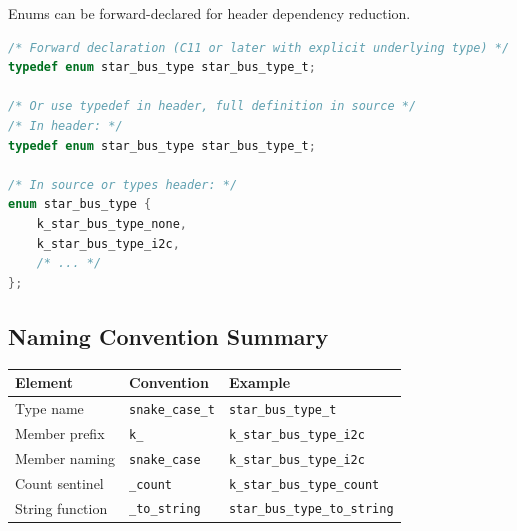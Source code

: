 Enums can be forward-declared for header dependency reduction.

\begin{lstlisting}[language=C]
/* Forward declaration (C11 or later with explicit underlying type) */
typedef enum star_bus_type star_bus_type_t;

/* Or use typedef in header, full definition in source */
/* In header: */
typedef enum star_bus_type star_bus_type_t;

/* In source or types header: */
enum star_bus_type {
    k_star_bus_type_none,
    k_star_bus_type_i2c,
    /* ... */
};
\end{lstlisting}

\subsection{Naming Convention Summary}

\begin{center}
\begin{tabular}{|l|l|l|}
\hline
\textbf{Element} & \textbf{Convention} & \textbf{Example} \\
\hline
Type name & \texttt{snake\_case\_t} & \texttt{star\_bus\_type\_t} \\
\hline
Member prefix & \texttt{k\_} & \texttt{k\_star\_bus\_type\_i2c} \\
\hline
Member naming & \texttt{snake\_case} & \texttt{k\_star\_bus\_type\_i2c} \\
\hline
Count sentinel & \texttt{\_count} & \texttt{k\_star\_bus\_type\_count} \\
\hline
String function & \texttt{\_to\_string} & \texttt{star\_bus\_type\_to\_string} \\
\hline
\end{tabular}
\end{center}

